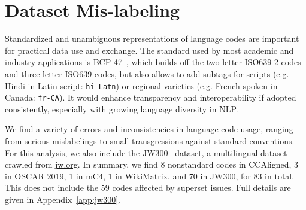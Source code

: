 \section{Dataset Mis-labeling}
\label{sec:codes}
Standardized and unambiguous representations of language codes are important for practical data use and exchange. The standard used by most academic and industry applications is BCP-47~\citep{phillips-etal-2005-tags}, which builds off the two-letter ISO639-2 codes and three-letter ISO639 codes, but also allows to add subtags for scripts (e.g. Hindi in Latin script: \texttt{hi-Latn}) or regional varieties (e.g. French spoken in Canada: \texttt{fr-CA}). It would enhance transparency and interoperability if adopted consistently, especially with growing language diversity in NLP. %

We find a variety of errors and inconsistencies in language code usage, ranging from serious mislabelings to small transgressions against standard conventions. For this analysis, we also include the JW300~\citep{agic-vulic-2019-jw300} dataset, a multilingual dataset crawled from \url{jw.org}. %
In summary, we find 8 nonstandard codes in CCAligned, 3 in OSCAR 2019, 1 in mC4, 1 in WikiMatrix, and 70 in JW300, for 83 in total. This does not include the 59 codes affected by superset issues. %
Full details are given in Appendix~\ref{app:jw300}.

